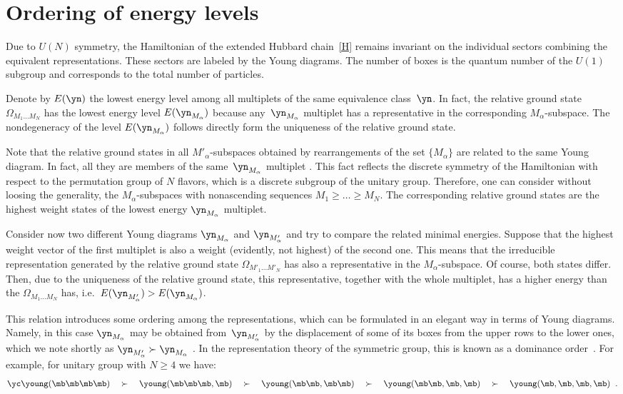 \section{Ordering of energy levels}\label{section5}


Due to $U(N)$ symmetry, the Hamiltonian of the extended Hubbard chain~\eqref{H}
remains invariant on the individual sectors  combining the equivalent
representations. These sectors are labeled by the Young diagrams.
The number of boxes is the quantum number of the $U(1)$ subgroup and corresponds
to the total number of particles.

Denote by $E(\yn)$ the lowest energy level among
all  multiplets of the same equivalence class~$\yn$.
In fact, the relative ground state $\Omega_{M_1\dots M_N}$ has the lowest energy
level $E(\yn_{M_\alpha})$ because any~$\yn_{M_\alpha}$ multiplet has a representative
in the corresponding $M_\alpha$-subspace. The nondegeneracy of the level  $E(\yn_{M_\alpha})$
follows directly form the uniqueness of the relative ground state.

Note that the relative ground states in all $M'_{\alpha}$-subspaces obtained by
rearrangements of the set $\{M_\alpha\}$ are related to the same Young diagram.
In fact, all they are members of the same~$\yn_{M_\alpha}$ multiplet \cite{H04}.
This fact ref\/lects the discrete symmetry of the Hamiltonian  with  respect to
the permutation group of $N$ f\/lavors, which is a discrete subgroup of the unitary group.
Therefore, one can consider without loosing the generality, the $M_\alpha$-subspaces
with nonascending sequences $M_1\ge\dots\ge M_N$.
The corresponding relative ground states are the highest weight states of the
lowest energy $\yn_{M_\alpha}$ multiplet.

Consider now two dif\/ferent Young diagrams $\yn_{M_\alpha}$ and $\yn_{M'_\alpha}$
and try to compare the related minimal energies.
Suppose that  the highest weight vector of the f\/irst multiplet is also a weight (evidently, not
highest) of the second one.
This means that the irreducible representation generated by the relative
ground state  $\Omega_{M'_1\dots M'_N}$ has also a representative in the
$M_\alpha$-subspace. Of course, both states dif\/fer. Then, due to
the uniqueness of the relative ground state,  this representative, together
with the whole multiplet, has a higher energy  than the $\Omega_{M_1\dots M_N}$ has,
i.e.\
$E(\yn_{M'_\alpha})>E(\yn_{M_\alpha})$.

This relation introduces some ordering among the representations,
which can be formulated in an elegant way in terms
of  Young diagrams. Namely, in this case $\yn_{M_\alpha}$ may be obtained from~$\yn_{M'_\alpha}$ by the displacement of some of its boxes from the upper rows to the lower ones,
which we note shortly as $\yn_{M'_\alpha}\succ\yn_{M_\alpha}$ \cite{H04}.
In the representation theory of the symmetric group, this is known as a dominance
order~\cite{Mac}.
For example, for unitary group with $N\ge 4$ we have:
\[
{\yc
\young(\mb\mb\mb\mb) \quad \succ \quad
\young(\mb\mb\mb,\mb) \quad \succ \quad
\young(\mb\mb,\mb\mb)\quad \succ \quad
\young(\mb\mb,\mb,\mb) \quad \succ \quad
\young(\mb,\mb,\mb,\mb)
\;\; .
}
\]

